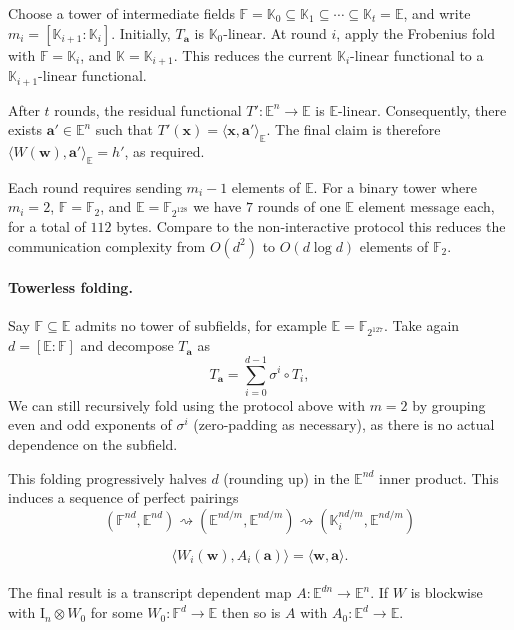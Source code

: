 \documentclass[11pt,letterpaper,usenames,dvipsnames]{article}
\begin{document}
\begin{construction}
Choose a tower of intermediate fields $\mathbb F=\mathbb K_0 \subseteq\mathbb K_1 \subseteq\cdots \subseteq\mathbb K_t=\mathbb E$, and write $m_i=[\mathbb K_{i+1}:\mathbb K_i]$. Initially, $T_{\mathbf a}$ is $\mathbb K_0$-linear. At round $i$, apply the Frobenius fold with $\mathbb F=\mathbb K_i$, and $\mathbb K=\mathbb K_{i+1}$.  This reduces the current $\mathbb K_i$-linear functional to a $\mathbb K_{i+1}$-linear functional.

After $t$ rounds, the residual functional $T':\mathbb E^n\to\mathbb E$ is $\mathbb E$-linear. Consequently, there exists $\mathbf a'\in\mathbb E^n$ such that $T'(\mathbf x)=\langle\mathbf x,\mathbf a'\rangle_{\mathbb E}$. The final claim is therefore $\langle W(\mathbf w),\mathbf a'\rangle_{\mathbb E}=h'$, as required.
\end{construction}

Each round requires sending $m_i - 1$ elements of $\mathbb{E}$. For a binary tower where $m_i=2$, $\mathbb{F} = \mathbb{F}_2$, and $\mathbb{E} = \mathbb{F}_{2^{128}}$ we have $7$ rounds of one $\mathbb{E}$ element message each, for a total of $112$ bytes. Compare to the non-interactive protocol this reduces the communication complexity from $O(d^2)$ to $O(d \log d)$ elements of $\mathbb{F}_2$.

\paragraph{Towerless folding.}
Say $\mathbb{F} \subseteq \mathbb{E}$ admits no tower of subfields, for example $\mathbb{E} = \mathbb{F}_{2^{127}}$. Take again $d = [\mathbb{E}: \mathbb{F}]$ and decompose $T_\mathbf{a}$ as
\[
T_{\mathbf a} = \sum_{i=0}^{d-1}\sigma^i\circ T_i,
\]
We can still recursively fold using the protocol above with $m=2$ by grouping even and odd exponents of $\sigma^i$ (zero-padding as necessary), as there is no actual dependence on the subfield.

This folding progressively halves $d$ (rounding up) in the $\mathbb{E}^{nd}$ inner product. This induces a sequence of perfect pairings 
\[
(\mathbb F^{nd},\mathbb E^{nd}) \rightsquigarrow (\mathbb E^{nd/m},\mathbb E^{nd/m}) \rightsquigarrow (\mathbb K_i^{nd/m},\mathbb E^{nd/m})
\] 

\[
\langle
W_i(\mathbf w),
A_i(\mathbf a)
\rangle
=
\langle
\mathbf w,
\mathbf a
\rangle.
\]

\paragraph{}
The final result is a transcript dependent map $A: \mathbb{E}^{dn} \to \mathbb{E}^n$. If $W$ is blockwise with $\mathrm{I}_n \otimes W_0$ for some $W_0: \mathbb{F}^d \to \mathbb{E}$ then so is $A$ with $A_0: \mathbb{E}^d \to \mathbb{E}$.
\end{document}
